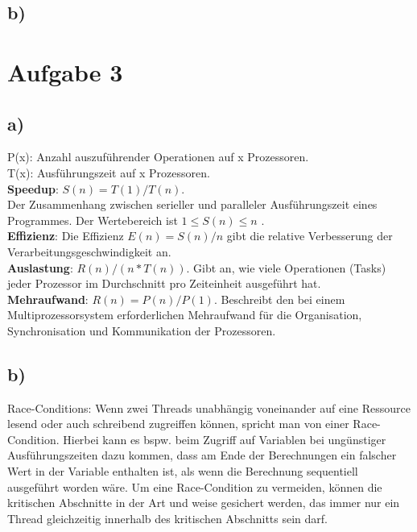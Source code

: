 \documentclass{article}
\begin{document}
	\subsection{b)}

    \section{Aufgabe 3}
    
        \subsection{a)}
        P(x): Anzahl auszuführender Operationen auf x Prozessoren.\\
        T(x): Ausführungszeit auf x Prozessoren.\\
        
        \textbf{Speedup}:  $S(n) = T(1)/T(n) $. \\ Der Zusammenhang zwischen serieller und paralleler Ausführungszeit eines Programmes. Der Wertebereich ist $ 1 \leq S(n) \leq n $ .\\
        
        \textbf{Effizienz}: Die Effizienz $ E(n) = S(n)/n $ gibt die relative Verbesserung der Verarbeitungsgeschwindigkeit an.\\
        
        \textbf{Auslastung}: $ R(n)/(n*T(n)) $. Gibt an, wie viele Operationen (Tasks) jeder Prozessor im Durchschnitt pro Zeiteinheit ausgeführt hat.\\
        
        \textbf{Mehraufwand}: $ R(n) = P(n)/P(1) $. Beschreibt den bei einem Multiprozessorsystem erforderlichen Mehraufwand für die Organisation, Synchronisation und Kommunikation der Prozessoren.\\
        
        \subsection{b)}
        Race-Conditions: Wenn zwei Threads unabhängig voneinander auf eine Ressource lesend oder auch schreibend zugreiffen können, 
        spricht man von einer Race-Condition. Hierbei kann es bspw. beim Zugriff auf Variablen bei ungünstiger Ausführungszeiten
        dazu kommen, dass am Ende der Berechnungen ein falscher Wert in der Variable enthalten ist, als wenn die Berechnung sequentiell 
        ausgeführt worden wäre.
        Um eine Race-Condition zu vermeiden, können die kritischen Abschnitte in der Art und weise gesichert werden, das immer nur ein 
        Thread gleichzeitig innerhalb des kritischen Abschnitts sein darf.
\end{document}
